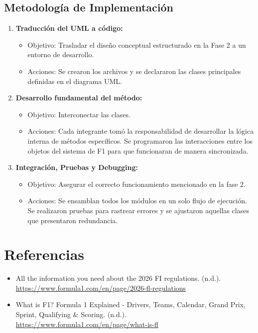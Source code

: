 \documentclass[12pt,a4paper]{article}
\begin{document}
\subsection{Metodología de Implementación}
\begin{enumerate}
    \item \textbf{Traducción del UML a código:}
    \begin{itemize}
        \item Objetivo: Trasladar el diseño conceptual estructurado en la Fase 2 a un entorno de desarrollo.
        \item Acciones: Se crearon los archivos y se declararon las clases principales definidas en el diagrama UML.
    \end{itemize}
    \item \textbf{Desarrollo fundamental del método:}
    \begin{itemize}
        \item Objetivo: Interconectar las clases.
        \item Acciones: Cada integrante tomó la responsabilidad de desarrollar la lógica interna de métodos específicos. Se programaron las interacciones entre los objetos del sistema de F1 para que funcionaran de manera sincronizada.
    \end{itemize}
    \item \textbf{Integración, Pruebas y Debugging:}
    \begin{itemize}
        \item Objetivo: Asegurar el correcto funcionamiento mencionado en la fase 2.
        \item Acciones: Se ensamblan todos los módulos en un solo flujo de ejecución. Se realizaron pruebas para rastrear errores y se ajustaron aquellas clases que presentaron redundancia.
    \end{itemize}
\end{enumerate}

\section{Referencias}
\begin{itemize}
    \item All the information you need about the 2026 FI regulations. (n.d.). \url{https://www.formula1.com/en/page/2026-fl-regulations}
    \item What is F1? Formula 1 Explained - Drivers, Teams, Calendar, Grand Prix, Sprint, Qualifying \& Scoring. (n.d.). \url{https://www.formula1.com/en/page/what-is-fl}
\end{itemize}
\end{document}
